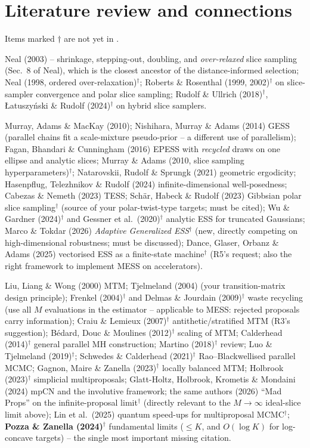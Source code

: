 \documentclass[11pt,a4paper]{article}
\theoremstyle{remark}
\begin{document}
\section{Literature review and connections}\label{sec:lit}
Items marked $\dagger$ are not yet in .
\begin{description}[leftmargin=*,style=nextline]
\item[Slice sampling foundations] Neal (2003) -- shrinkage, stepping-out, doubling, and \emph{over-relaxed} slice sampling (Sec.~8 of Neal), which is the closest ancestor of the distance-informed selection; Neal (1998, ordered over-relaxation)$^\dagger$; Roberts \& Rosenthal (1999, 2002)$^\dagger$ on slice-sampler convergence and polar slice sampling; Rudolf \& Ullrich (2018)$^\dagger$, {\L}atuszy\'nski \& Rudolf (2024)$^\dagger$ on hybrid slice samplers.
\item[ESS family] Murray, Adams \& MacKay (2010); Nishihara, Murray \& Adams (2014) GESS (parallel chains fit a scale-mixture pseudo-prior -- a different use of parallelism); Fagan, Bhandari \& Cunningham (2016) EPESS with \emph{recycled} draws on one ellipse and analytic slices; Murray \& Adams (2010, slice sampling hyperparameters)$^\dagger$; Natarovskii, Rudolf \& Sprungk (2021) geometric ergodicity; Hasenpflug, Telezhnikov \& Rudolf (2024) infinite-dimensional well-posedness; Cabezas \& Nemeth (2023) TESS; Schär, Habeck \& Rudolf (2023) Gibbsian polar slice sampling$^\dagger$ (source of your polar-twist-type targets; must be cited); Wu \& Gardner (2024)$^\dagger$ and Gessner et al.\ (2020)$^\dagger$ analytic ESS for truncated Gaussians; Marco \& Tokdar (2026) \emph{Adaptive Generalized ESS}$^\dagger$ (new, directly competing on high-dimensional robustness; must be discussed); Dance, Glaser, Orbanz \& Adams (2025) vectorised ESS as a finite-state machine$^\dagger$ (R5's request; also the right framework to implement MESS on accelerators).
\item[Multiproposal / multiple-try MCMC] Liu, Liang \& Wong (2000) MTM; Tjelmeland (2004) (your transition-matrix design principle); Frenkel (2004)$^\dagger$ and Delmas \& Jourdain (2009)$^\dagger$ waste recycling (use all $M$ evaluations in the estimator -- applicable to MESS: rejected proposals carry information); Craiu \& Lemieux (2007)$^\dagger$ antithetic/stratified MTM (R3's suggestion); B\'edard, Douc \& Moulines (2012)$^\dagger$ scaling of MTM; Calderhead (2014)$^\dagger$ general parallel MH construction; Martino (2018)$^\dagger$ review; Luo \& Tjelmeland (2019)$^\dagger$; Schwedes \& Calderhead (2021)$^\dagger$ Rao--Blackwellised parallel MCMC; Gagnon, Maire \& Zanella (2023)$^\dagger$ locally balanced MTM; Holbrook (2023)$^\dagger$ simplicial multiproposals; Glatt-Holtz, Holbrook, Krometis \& Mondaini (2024) mpCN and the involutive framework; the same authors (2026) ``Mad Props'' on the infinite-proposal limit$^\dagger$ (directly relevant to the $M\to\infty$ ideal-slice limit above); Lin et al.\ (2025) quantum speed-ups for multiproposal MCMC$^\dagger$; \textbf{Pozza \& Zanella (2024)}$^\dagger$ fundamental limits ($\le K$, and $O(\log K)$ for log-concave targets) -- the single most important missing citation.

\end{description}
\end{document}
